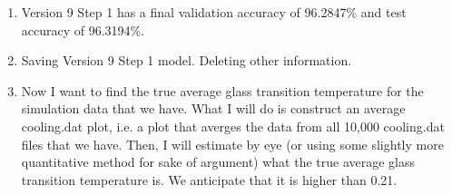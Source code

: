 \documentclass[12pt,reqno]{amsart}
\numberwithin{equation}{section}
\begin{document}
\begin{enumerate}
\item Version 9 Step 1 has a final validation accuracy of 96.2847\% and test accuracy of 96.3194\%.  

\item Saving Version 9 Step 1 model.  Deleting other information.

\item Now I want to find the true average glass transition temperature for the simulation data that we have.  What I will do is construct an average cooling.dat plot, i.e. a plot that averges the data from all 10,000 cooling.dat files that we have.  Then, I will estimate by eye (or using some slightly more quantitative method for sake of argument) what the true average glass transition temperature is.  We anticipate that it is higher than 0.21.  

\end{enumerate}
\end{document}
